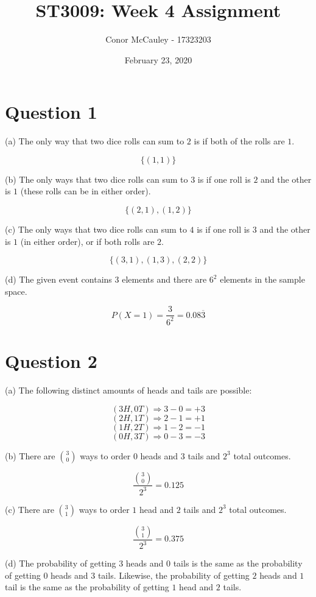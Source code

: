 \documentclass[12pt]{article}
\title{ST3009: Week 4 Assignment}
\author{Conor McCauley - 17323203}
\date{February 23, 2020}
\begin{document}
\maketitle

\section*{Question 1}

\noindent (a) The only way that two dice rolls can sum to $2$ is if both of the rolls are $1$.

$$ \{(1,1)\} $$

\noindent (b) The only ways that two dice rolls can sum to $3$ is if one roll is $2$ and the other is $1$ (these rolls can be in either order).

$$ \{(2,1),(1,2)\} $$

\noindent (c) The only ways that two dice rolls can sum to $4$ is if one roll is $3$ and the other is $1$ (in either order), or if both rolls are $2$.

$$ \{(3,1),(1,3),(2,2)\} $$

\noindent (d) The given event contains $3$ elements and there are $6^2$ elements in the sample space.

$$ P(X=1) = \frac{3}{6^2} = 0.08\overline{3}$$

\section*{Question 2}

\noindent (a) The following distinct amounts of heads and tails are possible:

$$ (3H, 0T) \Rightarrow 3 - 0 = +3 $$
$$ (2H, 1T) \Rightarrow 2 - 1 = +1 $$
$$ (1H, 2T) \Rightarrow 1 - 2 = -1 $$
$$ (0H, 3T) \Rightarrow 0 - 3 = -3 $$

\noindent (b) There are ${3 \choose 0}$ ways to order $0$ heads and $3$ tails and $2^3$ total outcomes.

$$ \frac{{3 \choose 0}}{2^3} = 0.125 $$

\noindent (c) There are ${3 \choose 1}$ ways to order $1$ head and $2$ tails and $2^3$ total outcomes.

$$ \frac{{3 \choose 1}}{2^3} = 0.375 $$

\noindent (d) The probability of getting $3$ heads and $0$ tails is the same as the probability of getting $0$ heads and $3$ tails. Likewise, the probability of getting $2$ heads and $1$ tail is the same as the probability of getting $1$ head and $2$ tails.
\end{document}
